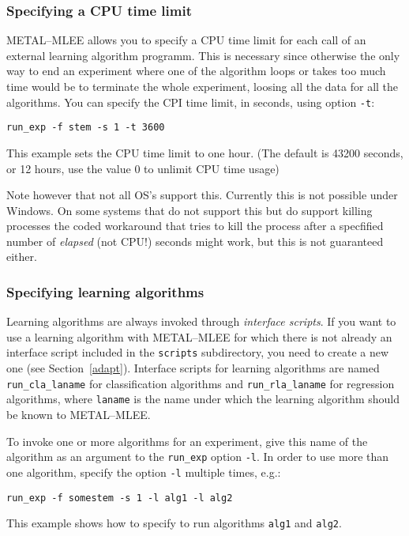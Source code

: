 \documentclass[a4paper,10pt,twoside]{article}
\newcommand{\eenameshort}{\textsf{METAL--MLEE}}
\begin{document}
\subsubsection{Specifying a CPU time limit}
\eenameshort{} allows you to specify a CPU time limit for each
call of an external learning algorithm programm. This is necessary
since otherwise the only way to end an experiment where one
of the algorithm loops or takes too much time would be 
to terminate the whole experiment, loosing all the data for 
all the algorithms. You can specify the CPI time limit, in seconds, 
using option \texttt{-t}:
\begin{verbatim}
run_exp -f stem -s 1 -t 3600
\end{verbatim}
This example sets the CPU time limit to one hour.
(The default is 43200 seconds, or 12 hours, use the value
0 to unlimit CPU time usage)

Note however that not all OS's support this. Currently 
this is not possible under Windows. On some systems that do not support this
but do support killing processes the coded workaround that tries 
to kill the process after a specfified number of \emph{elapsed} 
(not CPU!) seconds might work, but this is not guaranteed either.

\subsubsection{Specifying learning algorithms}
 Learning algorithms
are always invoked through \emph{interface scripts}.
If you want to use a learning algorithm with \eenameshort{}
for which there is not already an interface script included
in the \texttt{scripts} subdirectory, you need to create a new
one (see Section~\ref{adapt}). Interface scripts for learning 
algorithms are named \texttt{run\_cla\_laname} for classification
algorithms and \texttt{run\_rla\_laname} for regression
algorithms, where \texttt{laname} is the name under which the
learning algorithm should be known to \eenameshort{}.

To invoke one or more algorithms for an experiment, give this 
name of the algorithm as an argument to the \texttt{run\_exp}
option \texttt{-l}. In order to use more than one algorithm, 
specify the option \texttt{-l} multiple times, e.g.:
\begin{verbatim}
run_exp -f somestem -s 1 -l alg1 -l alg2 
\end{verbatim}
This example shows how to specify to run algorithms \texttt{alg1}
and \texttt{alg2}.
\end{document}
